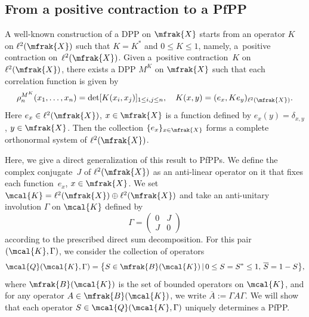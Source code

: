 \subsection{From a positive contraction to a PfPP}
A well-known construction of a DPP on $\mfrak{X}$ \cite{Soshnikov2000} starts from an operator $K$ on $\ell^{2}(\mfrak{X})$ such that $K=K^{\ast}$ and $0\le K\le 1$, namely, a~positive contraction on~$\ell^{2}(\mfrak{X})$. Given a~positive contraction~$K$ on $\ell^{2}(\mfrak{X})$, there exists a DPP $M^{K}$ on $\mfrak{X}$ such that each correlation function is given by
\begin{equation*}
	\rho^{M^{K}}_{n}(x_{1},\dots, x_{n})=\det [K(x_{i},x_{j}) ]_{1\le i,j\le n},\quad K(x,y)=(e_{x},Ke_{y})_{\ell^{2}(\mfrak{X})}.
\end{equation*}
Here $e_{x}\in \ell^{2}(\mfrak{X})$, $x\in\mfrak{X}$ is a function defined by $e_{x}(y)=\delta_{x,y}$, $y\in\mfrak{X}$. Then the collection $\{e_{x}\}_{x\in\mfrak{X}}$ forms a complete orthonormal system of $\ell^{2}(\mfrak{X})$.

Here, we give a direct generalization of this result to PfPPs.
We define the complex conjugate~$J$ of $\ell^{2}(\mfrak{X})$ as an anti-linear operator on it that fixes each function~$e_{x}$, $x\in\mfrak{X}$.
We set $\mcal{K}=\ell^{2}(\mfrak{X})\oplus \ell^{2}(\mfrak{X})$ and take an anti-unitary involution $\Gamma$ on $\mcal{K}$ defined by
\begin{equation}
\label{eq:Gamma}
	\Gamma=\left(
	\begin{matrix}
	0 & J \\
	J & 0
	\end{matrix}
	\right)
\end{equation}
according to the prescribed direct sum decomposition.
For this pair $(\mcal{K},\Gamma)$, we consider the collection of operators
\begin{equation}
\label{eq:collection_covariance_ops}
	\mcal{Q}(\mcal{K},\Gamma)=\big\{S\in\mfrak{B}(\mcal{K})\,|\,0\le S=S^{\ast}\le 1,\, \overline{S}=1-S\big\},
\end{equation}
where $\mfrak{B}(\mcal{K})$ is the set of bounded operators on $\mcal{K}$, and for any operator $A\in\mfrak{B}(\mcal{K})$, we write $\overline{A}:=\Gamma A\Gamma$.
We will show that each operator $S\in\mcal{Q}(\mcal{K},\Gamma)$ uniquely determines a PfPP.

